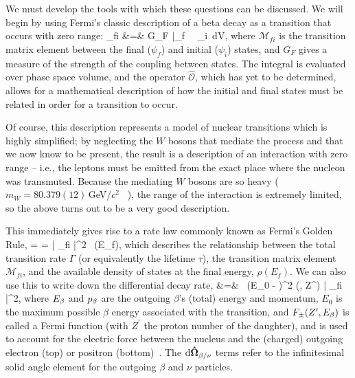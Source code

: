 We must develop the tools with which these questions can be discussed.  We will begin by using Fermi's classic description of a beta decay as a transition that occurs with zero range:
\bea
{}_{fi} &=& G_F \int \bar{\psi}_f \,  \, \psi_i \,\textrm{d}V,
\label{eq:fermitransition}
\eea 
where $\mathcal{M}_{fi}$ is the transition matrix element between the final ($\psi_f$) and initial ($\psi_i$) states, and $G_F$ gives a measure of the strength of the coupling between states.  The integral is evaluated over phase space volume, and the operator $\mathcal{\hat{O}}$, which has yet to be determined, allows for a mathematical description of how the initial and final states must be related in order for a transition to occur.

Of course, this description represents a model of nuclear transitions which is highly simplified;  by neglecting the $W$ bosons that mediate the process and that we now know to be present, the result is a description of an interaction with zero range -- i.e., the leptons must be emitted from the exact place where the nucleon was transmuted.  Because the mediating $W$ bosons are so heavy ($m_W = 80.379(12)$\,GeV/$c^2$ ~\cite{pdg2018}), the range of the interaction is extremely limited, so the above turns out to be a very good description.  

This immediately gives rise to a rate law commonly known as Fermi's Golden Rule, 
\beq
\Gamma \;\; = \;\;   \;\; = \;\; \frac{2\pi}{\hbar} \left| _{fi} \right|^2 \, \rho(E_f),
\eeq
which describes the relationship between the total transition rate $\Gamma$ (or equivalently the lifetime $\tau$), the transition matrix element $\mathcal{M}_{fi}$, and the available density of states at the final energy, $\rho(E_f)$.  We can also use this to write down the differential decay rate, 
\bea
{} 
&=&  \, \pbeta \Ebeta (E_0 - \Ebeta)^2 \FFpm (\Ebeta, Z^\prime) \left| _{fi} \right|^2,
\label{eq:fermidifferentialdecayrate}
\eea
where 
$E_{\beta}$ and $p_{\beta}$ are the outgoing $\beta$'s (total) energy and momentum,
$E_0$ is the maximum possible $\beta$ energy associated with the transition, 
and $F_{\pm}(Z^\prime, E_\beta)$ is called a Fermi function (with $Z^\prime$ the proton number of the daughter), and is used to account for the electric force between the nucleus and the (charged) outgoing electron (top) or positron (bottom)~\cite{Fermi1934Italian,Fermi1934German,krane}.  The $\textrm{d}\bf{\hat{\Omega}_{\beta/\nu}}$ terms refer to the infinitesimal solid angle element for the outgoing $\beta$ and $\nu$ particles.

